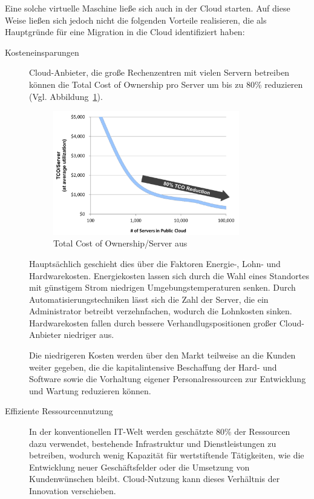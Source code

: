 Eine solche virtuelle Maschine ließe sich auch in der Cloud starten. Auf diese 
Weise ließen sich jedoch nicht die folgenden Vorteile realisieren, die 
 als Hauptgründe für eine Migration in die 
Cloud identifiziert haben:
\begin{description}
	\item[Kosteneinsparungen] Cloud-Anbieter, die große Rechenzentren
mit vielen Servern betreiben können die Total Cost of Ownership pro Server um
bis zu 80\% reduzieren (Vgl. Abbildung~\ref{fig:tco_reduction}).
\begin{figure}[!h]
\begin{center}
\includegraphics[width=0.8\textwidth]{images/tco_reduction.png}
\caption{Total Cost of Ownership/Server
aus \protect{}}
\label{fig:tco_reduction}
\end{center}
\end{figure}
 Hauptsächlich geschieht dies über die Faktoren Energie-, Lohn- und
Hardwarekosten. Energiekosten lassen sich durch die Wahl eines Standortes
mit günstigem Strom niedrigen Umgebungstemperaturen senken. Durch
Automatisierungstechniken lässt sich die Zahl der Server, die ein Administrator
betreibt verzehnfachen, wodurch die Lohnkosten sinken. Hardwarekosten fallen
durch bessere Verhandlugspositionen großer Cloud-Anbieter niedriger aus.

Die niedrigeren Kosten werden über den Markt teilweise an die Kunden weiter
gegeben, die die kapitalintensive Beschaffung der Hard- und Software sowie die
Vorhaltung eigener Personalressourcen zur Entwicklung und Wartung reduzieren
können. 

	\item[Effiziente Ressourcennutzung] In der konventionellen IT-Welt
werden geschätzte 80\% der Ressourcen dazu verwendet, bestehende Infrastruktur
und Dienstleistungen zu betreiben, wodurch wenig Kapazität für wertstiftende
Tätigkeiten, wie die Entwicklung neuer Geschäftsfelder oder die Umsetzung von
Kundenwünschen bleibt. Cloud-Nutzung kann
dieses Verhältnis der Innovation verschieben. 


\end{description}
